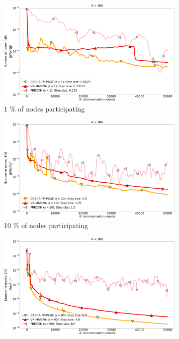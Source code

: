\documentclass[10pt]{article}
\begin{document}
\begin{figure}[H]
    \begin{subfigure}{.33\textwidth}
        \includegraphics[width=\textwidth]{neurips_2022_finite_sum_real-sim_nof_500_numnodes_100_more_probs_batch_size_1_frecon_number_of_workers_1.pdf}
        \caption{1 \% of nodes participating}
    \end{subfigure}
    \begin{subfigure}{.33\textwidth}
        \includegraphics[width=\textwidth]{neurips_2022_finite_sum_real-sim_nof_500_numnodes_100_more_probs_batch_size_1_frecon_number_of_workers_10.pdf}
        \caption{10 \% of nodes participating}
    \end{subfigure}
    \begin{subfigure}{.33\textwidth}
        \includegraphics[width=\textwidth]{neurips_2022_finite_sum_real-sim_nof_500_numnodes_100_more_probs_batch_size_1_frecon_number_of_workers_90.pdf}

\end{subfigure}
\end{figure}
\end{document}
